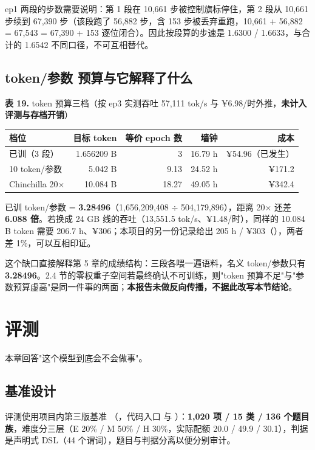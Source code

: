 \documentclass[11pt,openany]{ctexart}
\begin{document}
ep1 两段的步数需要说明：第 1 段在 10,661 步被控制旗标停住，第 2 段从 10,661 步续到 67,390 步（该段跑了 56,882 步，含 153 步被丢弃重跑，10,661 + 56,882 = 67,543 = 67,390 + 153 逐位闭合）。因此按段算的步速是 1.6300 / 1.6633，与合计的 1.6542 不同口径，不可互相替代。

\subsection{token/参数 预算与它解释了什么}

\noindent\textbf{表 19.} token 预算三档（按 ep3 实测吞吐 57,111 tok/s 与 ¥6.98/时外推，\textbf{未计入评测与存档开销}）

\begin{center}
\small
\begin{tabular}{lrrrr}
\toprule
\textbf{档位} & \textbf{目标 token} & \textbf{等价 epoch 数} & \textbf{墙钟} & \textbf{成本} \\
\midrule
已训（3 段） & 1.656209 B & 3 & 16.79 h & ¥54.96（已发生） \\
10 token/参数 & 5.042 B & 9.13 & 24.52 h & ¥171.2 \\
Chinchilla 20$\times$ & 10.084 B & 18.27 & 49.05 h & ¥342.4 \\
\bottomrule
\end{tabular}
\end{center}

已训 token/参数 = \textbf{3.28496}（1,656,209,408 $\div$ 504,179,896），距离 20$\times$ 还差 \textbf{6.088 倍}。若换成 24 GB 线的吞吐（13,551.5 tok/s、¥1.48/时），同样的 10.084 B token 需要 206.7 h、¥306；本项目的另一份记录给出 205 h / ¥303（），两者差 1\allowbreak{}\%，可以互相印证。

这个缺口直接解释第 5 章的成绩结构：三段各喂一遍语料，名义 token/参数只有 \textbf{3.28496}。2.4 节的零权重子空间若最终确认不可训练，则"token 预算不足"与"参数预算虚高"是同一件事的两面；\textbf{本报告未做反向传播，不据此改写本节结论}。

\section{评测}

本章回答"这个模型到底会不会做事"。

\subsection{基准设计}

评测使用项目内第三版基准 （，代码入口  与 ）：\textbf{1,020 项 / 15 类 / 136 个题目族}，难度分三层（E 20\allowbreak{}\% / M 50\allowbreak{}\% / H 30\allowbreak{}\%，实际配额 20.0 / 49.9 / 30.1），判据是声明式 DSL（44 个谓词），题目与判据分离以便分别审计。
\end{document}
